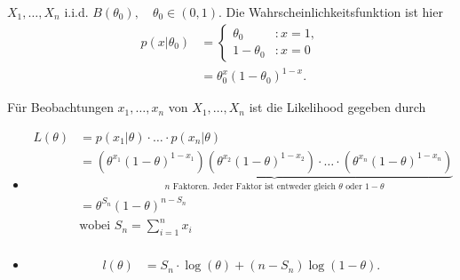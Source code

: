 \documentclass{tstextbook}
\begin{document}
\begin{example}
	$ X_1,\ldots,X_n $ i.i.d. $ B(\theta_0), \quad \theta_0 \in (0,1) $. Die Wahrscheinlichkeitsfunktion ist hier 
	\[
	\begin{aligned}
	p(x|\theta_0) & =\left\{\begin{array}{ll}
		\theta_0 & \colon x=1, \\
		1-\theta_0 & \colon x=0 \end{array}\right .\\
	& = \theta_0^x(1-\theta_0)^{1-x}.
	\end{aligned}
	\]
	
	Für Beobachtungen $ x_1,\ldots,x_n $ von $ X_1,\ldots,X_n $ ist die Likelihood gegeben durch 
	
		\begin{itemize}
	
	    \item  \[
	\begin{aligned}
		L(\theta) & = p(x_1|\theta)\cdot\ldots\cdot p(x_n|\theta) \\
		& = \underbrace{\left(\theta^{x_1}(1-\theta)^{1-x_1}\right)\left(\theta^{x_2}(1-\theta)^{1-x_2}\right)\cdot\ldots\cdot \left(\theta^{x_n}(1-\theta)^{1-x_n}\right)}_{n \text{ Faktoren. Jeder Faktor ist entweder gleich }\theta \text{ oder } 1-\theta} \\
		& = \theta^{S_n} (1-\theta)^{n-S_n}\\
		& \text{wobei } S_n= {\sum_{i=1}^{n}x_i}\\
	\end{aligned}
	\] 
	
	    \item \[
	\begin{aligned}
		l(\theta) & = S_n \cdot \log(\theta) + (n-S_n)\log(1-\theta).
	\end{aligned}
	\]
\vspace{0.5cm}	
	

\end{itemize}
\end{example}
\end{document}
